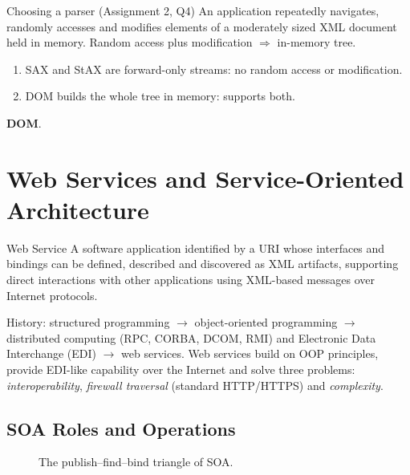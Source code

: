 \begin{solved}{Choosing a parser (Assignment 2, Q4)}
\Given An application repeatedly navigates, randomly accesses and modifies elements of a moderately sized XML
document held in memory.
\Formula Random access plus modification $\Rightarrow$ in-memory tree.
\Steps
\begin{enumerate}[leftmargin=*]
  \item SAX and StAX are forward-only streams: no random access or modification.
  \item DOM builds the whole tree in memory: supports both.
\end{enumerate}
\Answer \textbf{DOM}.
\end{solved}

\section{Web Services and Service-Oriented Architecture}
\begin{defbox}{Web Service}
A software application identified by a URI whose interfaces and bindings can be defined, described and
discovered as XML artifacts, supporting direct interactions with other applications using XML-based messages over
Internet protocols.
\end{defbox}
History: structured programming $\rightarrow$ object-oriented programming $\rightarrow$ distributed computing (RPC,
CORBA, DCOM, RMI) and Electronic Data Interchange (EDI) $\rightarrow$ web services. Web services build on OOP
principles, provide EDI-like capability over the Internet and solve three problems: \emph{interoperability},
\emph{firewall traversal} (standard HTTP/HTTPS) and \emph{complexity}.

\subsection{SOA Roles and Operations}
\begin{figure}[H]
\centering
{}
\caption{The publish--find--bind triangle of SOA.}
\end{figure}

